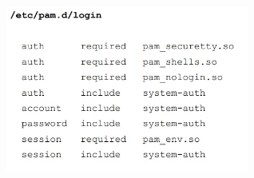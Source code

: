 \begin{itemize}
\begin{itemize}
		\includegraphics[width=0.6\textwidth]{img/OB-1_1.jpg}
	\end{itemize}
\end{itemize}